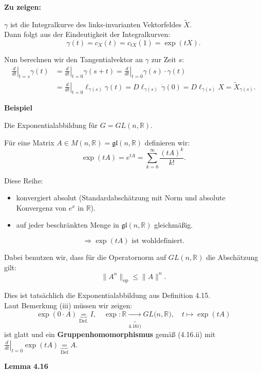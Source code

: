 \documentclass[fleqn, 12pt, letterpaper]{article}
\newcommand{\txt}[1]{\text{#1}}
\begin{document}
\textbf{Zu zeigen:} 

\( \gamma \) ist die Integralkurve des links-invarianten Vektorfeldes \( \tilde{X} \). \\

Dann folgt aus der Eindeutigkeit der Integralkurven:
\[
\gamma(t) = c_X(t)=c_{tX}(1)=\exp(tX).
\]

Nun berechnen wir den Tangentialvektor an \( \gamma \) zur Zeit \( s \):
\begin{align*}
\left.\frac{d}{dt}\right|_{t=s} \gamma(t) 
&= \left.\frac{d}{dt}\right|_{t=0} \gamma(s+t) 
= \left.\frac{d}{dt}\right|_{t=0} \gamma(s) \cdot \gamma(t) \\
&= \left.\frac{d}{dt}\right|_{t=0} \ell_{\gamma(s)} \gamma(t) 
= D \ell_{\gamma(s)} \, \dot{\gamma}(0) 
= D \ell_{\gamma(s)} X 
= \tilde{X}_{\gamma(s)}.
\end{align*}


\textbf{Beispiel}

Die Exponentialabbildung für \( G = GL(n, \mathbb{R}) \).

Für eine Matrix \( A \in M(n, \mathbb{R}) = \mathfrak{gl}(n, \mathbb{R}) \) definieren wir:
\[
\exp(tA) = e^{tA} = \sum_{k=0}^\infty \frac{(tA)^k}{k!}.
\]

Diese Reihe:
\begin{itemize}
    \item konvergiert absolut (Standardabschätzung mit Norm und absolute Konvergenz von $e^x$ in $\mathbb{R}$).
    \item auf jeder beschränkten Menge in \( \mathfrak{gl}(n, \mathbb{R}) \) gleichmäßig.
\end{itemize}
\[
\Rightarrow \exp(tA) \text{ ist wohldefiniert}.
\]

Dabei benutzen wir, dass für die Operatornorm auf \( GL(n, \mathbb{R}) \) die Abschätzung gilt:
\[
\|A^n\|_{\operatorname{op}} \leq \|A\|^n.
\]

Dies ist tatsächlich die Exponentialabbildung aus Definition 4.15. \\

Laut Bemerkung (iii) müssen wir zeigen:
\[
\exp(0 \cdot A) \underbrace{=}_{\txt{Def.}} I, \quad \exp : \mathbb{R} \underbrace{\rightarrow}_{4.16 i)} GL(n,\mathbb{R)}, \quad t \mapsto \exp(tA)
\]
ist glatt und ein \textbf{Gruppenhomomorphismus} gemäß (4.16.ii) mit $\left.\frac{d}{dt}\right|_{t=0} \exp(tA) \underbrace{=}_{\txt{Def}} A$.

\textbf{Lemma 4.16}
\end{document}
